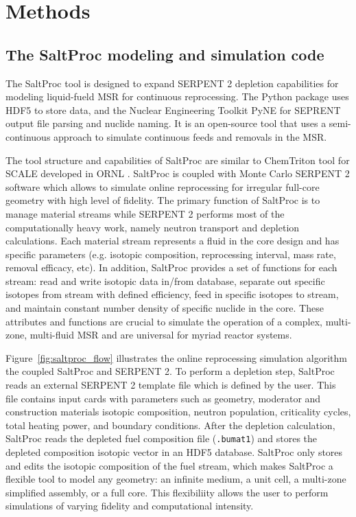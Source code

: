 
\section{Methods}


\subsection{The SaltProc modeling and simulation code}

The SaltProc tool is designed to expand SERPENT 2 depletion capabilities for modeling liquid-fueld \gls{MSR} for continuous reprocessing.
The Python package uses HDF5 \cite{the_hdf_group_hierarchial_1997} to store data, and the Nuclear Engineering Toolkit PyNE \cite{scopatz_pyne:_2012}
for SEPRENT output file parsing and nuclide naming. It is an open-source tool that uses a semi-continuous approach to 
simulate continuous feeds and removals in the \gls{MSR}.

The tool structure and capabilities of SaltProc are similar to ChemTriton tool for SCALE developed in \gls{ORNL} \cite{powers_new_2013}.
SaltProc is coupled with Monte Carlo SERPENT 2 software which allows to simulate online reprocessing for irregular full-core geometry with high level of fidelity.  The primary function of SaltProc is to manage material streams while SERPENT 2 performs most of the computationally heavy work, namely neutron transport and depletion calculations. Each material stream represents a fluid in the core design and has specific parameters (e.g. isotopic composition, reprocessing interval, mass rate, removal efficacy, etc). In addition, SaltProc provides a set of functions for each stream: read and write isotopic data in/from database, separate out specific isotopes from stream with defined efficiency, feed in specific isotopes to stream, and maintain constant number density of specific nuclide in the core. These attributes and functions are crucial to simulate the operation of a complex, multi-zone, multi-fluid \gls{MSR} and are universal for myriad reactor systems.

Figure~\ref{fig:saltproc_flow} illustrates the  online reprocessing simulation algorithm the coupled SaltProc and SERPENT 2. To perform a depletion step,
SaltProc reads an external SERPENT 2 template file which is defined by the user. This file contains input cards with parameters such as geometry,
moderator and construction materials isotopic composition, neutron population, criticality cycles, total heating power, and boundary conditions.
After the depletion calculation, SaltProc reads the depleted fuel composition file (\texttt{.bumat1}) and stores the depleted
composition isotopic vector in an HDF5 database. SaltProc only stores and edits the isotopic composition of the fuel stream,
which makes SaltProc a flexible tool to model any geometry: an infinite medium, a unit cell, a multi-zone simplified assembly, or a full core.
This flexibiliity allows the user to perform simulations of varying fidelity and computational intensity.

